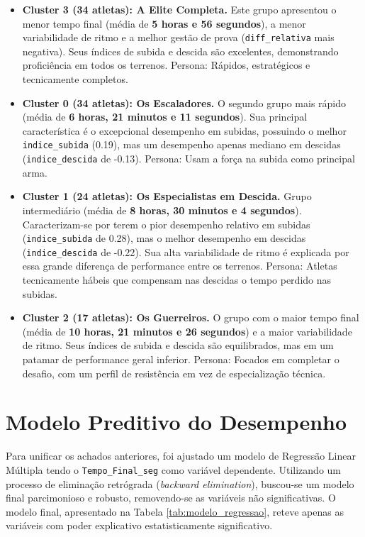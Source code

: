 \begin{itemize}
    \item \textbf{Cluster 3 (34 atletas): A Elite Completa.} Este grupo apresentou o menor tempo final (média de \textbf{5 horas e 56 segundos}), a menor variabilidade de ritmo e a melhor gestão de prova (\texttt{diff\_relativa} mais negativa). Seus índices de subida e descida são excelentes, demonstrando proficiência em todos os terrenos. Persona: Rápidos, estratégicos e tecnicamente completos.
    \item \textbf{Cluster 0 (34 atletas): Os Escaladores.} O segundo grupo mais rápido (média de \textbf{6 horas, 21 minutos e 11 segundos}). Sua principal característica é o excepcional desempenho em subidas, possuindo o melhor \texttt{indice\_subida} (0.19), mas um desempenho apenas mediano em descidas (\texttt{indice\_descida} de -0.13). Persona: Usam a força na subida como principal arma.
    \item \textbf{Cluster 1 (24 atletas): Os Especialistas em Descida.} Grupo intermediário (média de \textbf{8 horas, 30 minutos e 4 segundos}). Caracterizam-se por terem o pior desempenho relativo em subidas (\texttt{indice\_subida} de 0.28), mas o melhor desempenho em descidas (\texttt{indice\_descida} de -0.22). Sua alta variabilidade de ritmo é explicada por essa grande diferença de performance entre os terrenos. Persona: Atletas tecnicamente hábeis que compensam nas descidas o tempo perdido nas subidas.
    \item \textbf{Cluster 2 (17 atletas): Os Guerreiros.} O grupo com o maior tempo final (média de \textbf{10 horas, 21 minutos e 26 segundos}) e a maior variabilidade de ritmo. Seus índices de subida e descida são equilibrados, mas em um patamar de performance geral inferior. Persona: Focados em completar o desafio, com um perfil de resistência em vez de especialização técnica.
\end{itemize}

\section{Modelo Preditivo do Desempenho}

Para unificar os achados anteriores, foi ajustado um modelo de Regressão Linear Múltipla tendo o \texttt{Tempo\_Final\_seg} como variável dependente. Utilizando um processo de eliminação retrógrada (\textit{backward elimination}), buscou-se um modelo final parcimonioso e robusto, removendo-se as variáveis não significativas. O modelo final, apresentado na Tabela \ref{tab:modelo_regressao}, reteve apenas as variáveis com poder explicativo estatisticamente significativo.

